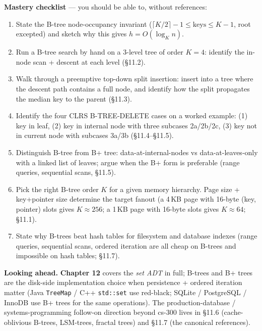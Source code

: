 \documentclass[11pt]{article}
\begin{document}
\begin{ideabox}
\textbf{Mastery checklist} --- you should be able to, without
references:
\begin{enumerate}
    \item State the B-tree node-occupancy invariant
          ($\lceil K/2 \rceil - 1 \le \text{keys} \le K-1$, root
          excepted) and sketch why this gives $h = O(\log_K n)$.
    \item Run a B-tree search by hand on a 3-level tree of order
          $K=4$: identify the in-node scan + descent at each level
          (\S11.2).
    \item Walk through a preemptive top-down split insertion: insert
          into a tree where the descent path contains a full node,
          and identify how the split propagates the median key to
          the parent (\S11.3).
    \item Identify the four CLRS B-TREE-DELETE cases on a worked
          example: (1) key in leaf, (2) key in internal node with
          three subcases 2a/2b/2c, (3) key not in current node with
          subcases 3a/3b (\S11.4--\S11.5).
    \item Distinguish B-tree from B+ tree: data-at-internal-nodes
          vs data-at-leaves-only with a linked list of leaves;
          argue when the B+ form is preferable (range queries,
          sequential scans, \S11.5).
    \item Pick the right B-tree order $K$ for a given memory
          hierarchy. Page size + key+pointer size determine the
          target fanout (a 4\,KB page with 16-byte (key, pointer)
          slots gives $K \approx 256$; a 1\,KB page with 16-byte
          slots gives $K \approx 64$; \S11.1).
    \item State why B-trees beat hash tables for filesystem and
          database indexes (range queries, sequential scans,
          ordered iteration are all cheap on B-trees and impossible
          on hash tables; \S11.7).
\end{enumerate}

\textbf{Looking ahead.} \textbf{Chapter 12} covers the \emph{set ADT}
in full; B-trees and B+ trees are the disk-side implementation
choice when persistence + ordered iteration matter (Java
\texttt{TreeMap} / C++ \texttt{std::set} use red-black; SQLite /
PostgreSQL / InnoDB use B+ trees for the same operations). The
production-database / systems-programming follow-on direction
beyond cs-300 lives in \S11.6 (cache-oblivious B-trees, LSM-trees,
fractal trees) and \S11.7 (the canonical references).
\end{ideabox}
\end{document}
